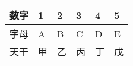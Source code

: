 \documentclass [nofonts] {ctexart}
\begin{document}
\begin {tabularx} {\textwidth} {|c|X|X|X|X|X|}
\hline
数字	& 1	& 2	& 3	& 4	& 5	\\
\hline
字母	& A	& B	& C	& D	& E	\\
\hline
天干	& 甲& 乙& 丙& 丁& 戊\\
\hline
\end {tabularx}
\end{document}
